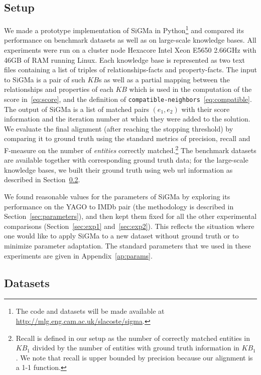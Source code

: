 \documentclass{sig-alternate}
\newcommand{\ts}[1]{\textsf{#1}}
\newcommand{\KB}{K\!B}
\begin{document}
\subsection{Setup} \label{ssec:setup}
We made a prototype implementation of \textsf{SiGMa} in Python\footnote{The code and datasets will be made available at \href{http://mlg.eng.cam.ac.uk/slacoste/sigma}{http://mlg.eng.cam.ac.uk/slacoste/sigma}.} and compared its performance on benchmark datasets as well as on large-scale knowledge bases. All experiments were run on a cluster node Hexacore Intel Xeon E5650 2.66GHz with 46GB of RAM running Linux. Each knowledge base is represented as two text files containing a list of triples of relationships-facts and property-facts. The input to \textsf{SiGMa} is a pair of such $\KB$s as well as a partial mapping between the relationships and properties of each $\KB$ which is used in the computation of the score in~\eqref{eq:score}, and the definition of \texttt{compatible-neighbors}~\eqref{eq:compatible}. The output of \textsf{SiGMa} is a list of matched pairs $(e_1,e_2)$ with their score information and the iteration number at which they were added to the solution. We evaluate the final alignment (after reaching the stopping threshold) by comparing it to ground truth using the standard metrics of precision, recall and F-measure on the number of \emph{entities} correctly matched.\footnote{Recall is defined in our setup as the number of correctly matched entities in $\KB_1$ divided by the number of entities with ground truth information in $\KB_1$. We note that recall is upper bounded by precision because our alignment is a 1-1 function.} The benchmark datasets are available together with corresponding ground truth data; for the large-scale knowledge bases, we built their ground truth using web url information as described in Section~\ref{sec:datasets}.

We found reasonable values for the parameters of \textsf{SiGMa} by
exploring its performance on the \ts{YAGO} to \ts{IMDb} pair (the
methodology is described in Section~\ref{sec:parameters}), and then
kept them fixed for all the other experimental comparisons
(Section~\ref{sec:exp1} and~\ref{sec:exp2}). This reflects the situation where one would like to apply \textsf{SiGMa} to a new dataset without ground truth or to minimize parameter adaptation. The standard parameters that we used in these experiments are given in Appendix~\ref{ap:params}.

\subsection{Datasets} \label{sec:datasets}
\end{document}
